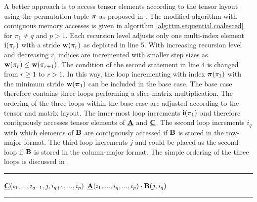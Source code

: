 A better approach is to access tensor elements according to the tensor layout using the permutation tuple $\boldsymbol{\pi}$ as proposed in \cite{bassoy:2018:fast}.
The modified algorithm with contiguous memory accesses is given in algorithm \ref{alg:ttm.sequential.coalesced} for $\pi_1 \neq q$ and $p > 1$.
Each recursion level adjusts only one multi-index element $\mathbf{i}(\pi_r)$ with a stride $\mathbf{w}(\pi_r)$ as depicted in line 5.
With increasing recursion level and decreasing $r$, indices are incremented with smaller step sizes as $\mathbf{w}(\pi_r) \leq \mathbf{w}(\pi_{r+1})$. 
The condition of the second  statement in line 4 is changed from $r \geq 1$ to $r > 1$.
In this way, the loop incrementing with index $\boldsymbol{\pi}(\pi_1)$ with the minimum stride $\mathbf{w}(\boldsymbol{\pi}_1)$ can be included in the base case.
The base case therefore contains three loops performing a slice-matrix multiplication. 
The ordering of the three loops within the base case are adjusted according to the tensor and matrix layout.
The inner-most loop increments $\mathbf{i}(\pi_1)$ and therefore contiguously accesses tensor elements of $\mubA$ and $\mubC$.
The second loop increments $i_q$ with which elements of $\mathbf{B}$ are contiguously accessed if $\mathbf{B}$ is stored in the row-major format.
The third loop increments $j$ and could be placed as the second loop if $\mathbf{B}$ is stored in the column-major format.
The simple ordering of the three loops is discussed in \cite{golub:2013:matrix.computations}.

\begin{algorithm}[t]
\DontPrintSemicolon
{}
%
\footnotesize 
\SetAlgoVlined
\hrule
\BlankLine
{}
{
	{
	}
	{
		{
			\;
		}		
	}	
	\Else%
	{
		{
			{			
				{
					$\underline{\mathbf{C}}(i_1,...,i_{q-1},j,i_{q+1},...,i_{p})$ \ttt{+=} $\underline{\mathbf{A}}(i_1,...,i_q,...,i_p) \cdot \mathbf{B}(j,i_q)$\;
				}
			}
		}
	}
}
\BlankLine
\hrule
\caption{
\footnotesize %
Modified baseline algorithm with contiguous memory access for the tensor-matrix multiplication.
The tensor order must be greater than one and for the contraction mode $1 \leq q \leq p$ and $\pi_1 \neq q$ must hold.
The algorithm needs to be initially called with $r=p$ where $\mbn$ is the shape tuple of $\mubA$ and $m$ is the $q$-th dimension of $\mubC$. 
Iteration along mode $\mhq$ with $\mhq = \mbpi^{-1}_q$ is moved into the inner-most recursion level.
\label{alg:ttm.sequential.coalesced}
}
\end{algorithm}

